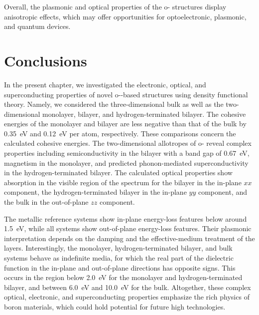 Overall, the plasmonic and optical properties of the o- structures display anisotropic effects,
which may offer opportunities for optoelectronic,
plasmonic, and quantum devices.

\FloatBarrier
\section{Conclusions}
\label{2_conclusions}

In the present chapter, we investigated the electronic, optical,
and superconducting properties of novel o--based structures using density functional theory.
Namely, we considered the three-dimensional bulk as well as the two-dimensional monolayer,
bilayer, and hydrogen-terminated bilayer.
The cohesive energies of the monolayer and bilayer are less negative than that of the bulk by \qty{0.35}{\electronvolt} and \qty{0.12}{\electronvolt} per atom, respectively.
These comparisons concern the calculated cohesive energies.
The two-dimensional allotropes of o- reveal complex properties including semiconductivity in the bilayer with a band gap of \qty{0.67}{\electronvolt},
magnetism in the monolayer, and predicted phonon-mediated superconductivity in the hydrogen-terminated bilayer.
The calculated optical properties show absorption in the visible region of the spectrum for the bilayer in the in-plane $xx$ component,
the hydrogen-terminated bilayer in the in-plane $yy$ component,
and the bulk in the out-of-plane $zz$ component.

The metallic reference systems show in-plane energy-loss features below around \qty{1.5}{\electronvolt},
while all systems show out-of-plane energy-loss features.
Their plasmonic interpretation depends on the damping and the effective-medium treatment of the layers.
Interestingly, the monolayer, hydrogen-terminated bilayer, and bulk systems behave as indefinite media,
for which the real part of the dielectric function in the in-plane and out-of-plane directions has opposite signs.
This occurs in the region below \qty{2.0}{\electronvolt} for the monolayer and hydrogen-terminated bilayer,
and between \qty{6.0}{\electronvolt} and \qty{10.0}{\electronvolt} for the bulk.
Altogether, these complex optical, electronic,
and superconducting properties emphasize the rich physics of boron materials,
which could hold potential for future high technologies.

